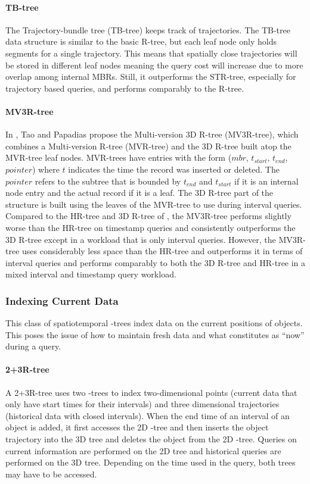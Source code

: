 \paragraph{TB-tree} The Trajectory-bundle tree (TB-tree) \cite{pfoser2000novel}
keeps track of trajectories. The TB-tree data structure is similar to the 
basic R-tree, but each leaf node only holds segments for a single 
trajectory. This means that spatially close trajectories will be stored in 
different leaf nodes meaning the query cost will increase due to more 
overlap among internal MBRs. Still, it outperforms the STR-tree, especially
for trajectory based queries, and performs comparably to the R-tree. 

\paragraph{MV3R-tree} In \cite{tao2001mv3r}, Tao and Papadias propose the 
Multi-version 3D R-tree (MV3R-tree), which combines a Multi-version R-tree (MVR-tree) 
and the 3D R-tree\cite{nascimento1999evaluation} built atop the MVR-tree leaf nodes.
MVR-trees have entries with the form ($mbr$, $t_{start}$, $t_{end}$, $pointer$)
where $t$ indicates the time the record was inserted or deleted. The $pointer$ 
refers to the subtree that is bounded by $t_{end}$ and $t_{start}$ if it is an
internal node entry and the actual record if it is a leaf. The 3D R-tree part
of the structure is built using the leaves of the MVR-tree to use during 
interval queries. Compared to the HR-tree and 3D R-tree of 
\cite{nascimento1999evaluation}, the MV3R-tree performs slightly
worse than the HR-tree on timestamp queries and consistently outperforms the 
3D R-tree except in a workload that is only interval queries. However, the 
MV3R-tree uses considerably less space than the HR-tree and outperforms it 
in terms of interval queries and performs comparably to both the 3D R-tree
and HR-tree in a mixed interval and timestamp query workload.

\subsubsection{Indexing Current Data}
This class of spatiotemporal \rbase-trees index data on the current positions of 
objects. This poses the issue of how to maintain fresh data and what constitutes 
as ``now'' during a query. 

\paragraph{2+3R-tree} A 2+3R-tree\cite{nascimento1999evaluation} uses two 
\rbase-trees to index two-dimensional points (current data that only have
start times for their intervals) and three dimensional trajectories 
(historical data with closed intervals). When the end time of an 
interval of an object is added, it first accesses the 2D \rbase-tree
and then inserts the object trajectory into the 3D tree and deletes the 
object from the 2D \rbase-tree. Queries on current information are 
performed on the 2D tree and historical queries are performed on the 3D
tree. Depending on the time used in the query, both trees may have to be 
accessed.

